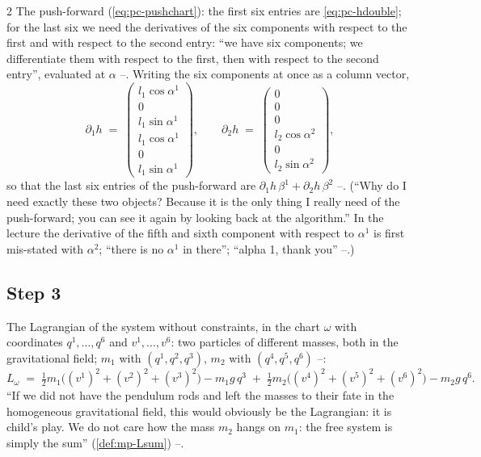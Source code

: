 \begin{paracol}{2}
The push-forward (\cref{eq:pc-pushchart}): the first six entries are \eqref{eq:pc-hdouble}; for the last six we need the derivatives of the six components with respect to the first and with respect to the second entry: ``we have six components; we differentiate them with respect to the first, then with respect to the second entry'', evaluated at $\alpha$ --. Writing the six components at once as a column vector,
\begin{equation}\label{eq:pc-dh}
  \partial_1h\;=\;\begin{pmatrix}l_1\cos\alpha^1\\0\\l_1\sin\alpha^1\\l_1\cos\alpha^1\\0\\l_1\sin\alpha^1\end{pmatrix},\qquad
  \partial_2h\;=\;\begin{pmatrix}0\\0\\0\\l_2\cos\alpha^2\\0\\l_2\sin\alpha^2\end{pmatrix},
\end{equation}
so that the last six entries of the push-forward are $\partial_1h\,\beta^1+\partial_2h\,\beta^2$ --. (``Why do I need exactly these two objects? Because it is the only thing I really need of the push-forward; you can see it again by looking back at the algorithm.'' In the lecture the derivative of the fifth and sixth component with respect to $\alpha^1$ is first mis-stated with $\alpha^2$; ``there is no $\alpha^1$ in there''; ``alpha 1, thank you'' --.)

\subsection{Step 3}\label{ssec:pc-d3}

The Lagrangian of the system without constraints, in the chart $\omega$ with coordinates $q^1,\dots,q^6$ and $v^1,\dots,v^6$: two particles of different masses, both in the gravitational field; $m_1$ with $(q^1,q^2,q^3)$, $m_2$ with $(q^4,q^5,q^6)$ --:
\begin{equation}\label{eq:pc-Ldouble}
  L_\omega\;=\;\tfrac12m_1\bigl((v^1)^2+(v^2)^2+(v^3)^2\bigr)-m_1g\,q^3\;+\;\tfrac12m_2\bigl((v^4)^2+(v^5)^2+(v^6)^2\bigr)-m_2g\,q^6 .
\end{equation}
``If we did not have the pendulum rods and left the masses to their fate in the homogeneous gravitational field, this would obviously be the Lagrangian: it is child's play. We do not care how the mass $m_2$ hangs on $m_1$: the free system is simply the sum'' (\cref{def:mp-Lsum}) --.


\end{paracol}
